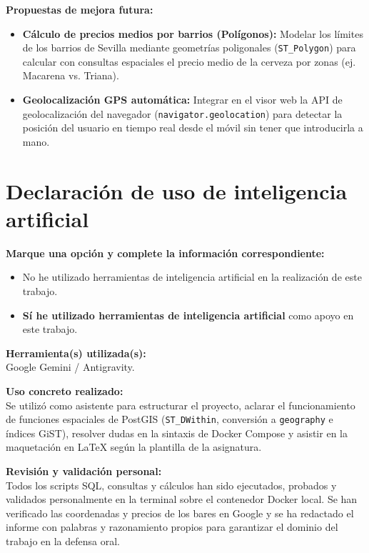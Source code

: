 \documentclass[a4paper,12pt]{article}
\begin{document}
\textbf{Propuestas de mejora futura:}
\begin{itemize}[leftmargin=1.0cm]
    \item \textbf{Cálculo de precios medios por barrios (Polígonos):} Modelar los límites de los barrios de Sevilla mediante geometrías poligonales (\texttt{ST\_Polygon}) para calcular con consultas espaciales el precio medio de la cerveza por zonas (ej. Macarena vs. Triana).
    \item \textbf{Geolocalización GPS automática:} Integrar en el visor web la API de geolocalización del navegador (\texttt{navigator.geolocation}) para detectar la posición del usuario en tiempo real desde el móvil sin tener que introducirla a mano.
\end{itemize}

\section{Declaración de uso de inteligencia artificial}

\textbf{Marque una opción y complete la información correspondiente:}

\begin{itemize}[label=$\square$,leftmargin=1.0cm]
  \item No he utilizado herramientas de inteligencia artificial en la realización de este trabajo.
  \item[\rlap{$\square$}{\raisebox{2pt}{\large\hspace{1pt}\textbf{X}}}] \textbf{Sí he utilizado herramientas de inteligencia artificial} como apoyo en este trabajo.
\end{itemize}

\textbf{Herramienta(s) utilizada(s):} \\
Google Gemini / Antigravity.

\textbf{Uso concreto realizado:} \\
Se utilizó como asistente para estructurar el proyecto, aclarar el funcionamiento de funciones espaciales de PostGIS (\texttt{ST\_DWithin}, conversión a \texttt{geography} e índices GiST), resolver dudas en la sintaxis de Docker Compose y asistir en la maquetación en LaTeX según la plantilla de la asignatura.

\textbf{Revisión y validación personal:} \\
Todos los scripts SQL, consultas y cálculos han sido ejecutados, probados y validados personalmente en la terminal sobre el contenedor Docker local. Se han verificado las coordenadas y precios de los bares en Google y se ha redactado el informe con palabras y razonamiento propios para garantizar el dominio del trabajo en la defensa oral.
\end{document}

